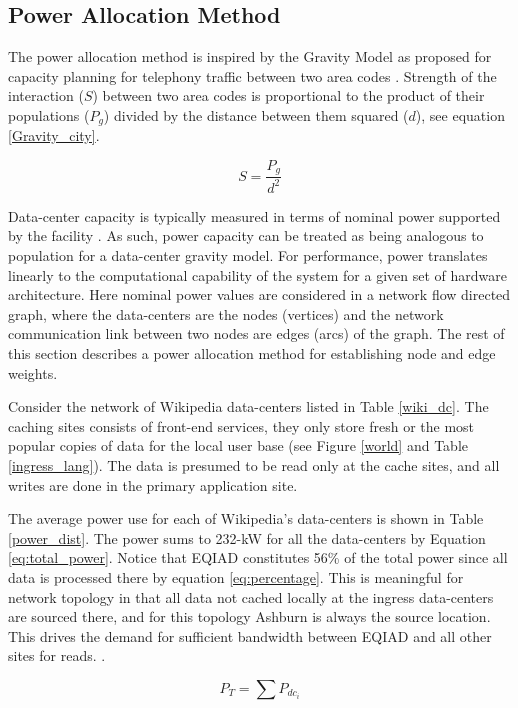 \documentclass[conference]{IEEEtran}
\begin{document}
\subsection{Power Allocation Method}

The power allocation method is inspired by the Gravity Model as proposed for capacity planning for telephony traffic between two area codes \cite{Gravity}. Strength of the interaction ($S$) between two area codes is proportional to the product of their populations ($P_g$) divided by the distance between them squared ($d$), see equation \ref{Gravity_city}. 

\begin{equation}
\label{Gravity_city}
S = \frac{P_g}{d^2}
\end{equation}

Data-center capacity is typically measured in terms of nominal power supported by the facility \cite{wsc}. As such, power capacity can be treated as being analogous to population for a data-center gravity model. For performance, power translates linearly to the computational capability of the system for a given set of hardware architecture. Here nominal power values are considered in a network flow directed graph, where the data-centers are the nodes (vertices) and the network communication link between two nodes are edges (arcs) of the graph. The rest of this section describes a power allocation method for establishing node and edge weights.

Consider the network of Wikipedia data-centers listed in Table \ref{wiki_dc}. The caching sites consists of front-end services, they only store fresh or the most popular copies of data for the local user base (see Figure \ref{world} and Table \ref{ingress_lang}). The data is presumed to be read only at the cache sites, and all writes are done in the primary application site. 

The average power use for each of Wikipedia's data-centers is shown in Table \ref{power_dist}. The power sums to 232-kW for all the data-centers by Equation \ref{eq:total_power}. Notice that EQIAD constitutes 56\% of the total power since all data is processed there by equation \ref{eq:percentage}. This is meaningful for network topology in that all data not cached locally at the ingress data-centers are sourced there, and for this topology Ashburn is always the source location. This drives the demand for sufficient bandwidth between EQIAD and all other sites for reads. .

\begin{equation}
P_{T}=\sum{P_{dc_i}}\label{eq:total_power}
\end{equation}
\end{document}
